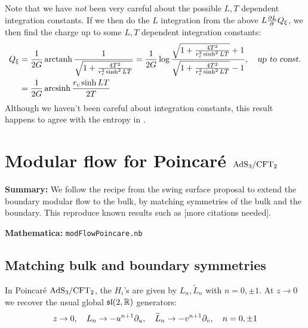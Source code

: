 \documentclass[11pt,a4paper,utf8]{article}
\renewcommand{\tilde}[1]{\ensuremath{\widetilde{#1}}}
\begin{document}
	Note that we have \textit{not} been very careful about the possible $L,T$ dependent integration constants. If we then do the $L$ integration from the above $L \frac{\partial{L}}{\partial{\,}}Q_\xi$, we then find the charge up to some $L,T$ dependent integration constants:
	\begin{equation}
	\begin{aligned}
		Q_\xi
		&= \frac{1}{2G} \operatorname{arctanh}
			\frac{1}{\sqrt{
				1 + \frac{4T^2}{r_c^2 \sinh^2 LT}
			}}
		= \frac{1}{2G} \log
			\frac{
				\sqrt{
					1 + \frac{4T^2}{r_c^2 \sinh^2 LT}
				} + 1
			}{
				\sqrt{
					1 + \frac{4T^2}{r_c^2 \sinh^2 LT}
				} - 1
			},
	\quad\textsl{up to const.} \\
		&= \frac{1}{2G} \operatorname{arcsinh}
			\frac{r_c \sinh LT}{2T}
	\end{aligned}
	\end{equation}
	Although we haven't been careful about integration constants, this result happens to agree with the entropy in \cite{Lewkowycz:2019xse}. 
	
	
\pagebreak
\appendix
\section{Modular flow for Poincar\'e $\mathrm{AdS}_3/\mathrm{CFT}_2$}
\label{sect:modFlowPoincare}

\textbf{Summary:} We follow the recipe from the swing surface proposal \cite{Apolo:2020bld,Apolo:2020qjm} to extend the boundary modular flow to the bulk, by matching symmetries of the bulk and the boundary. This reproduce known results such as \cite{Lashkari:2016idm,Czech:2019vih,Apolo:2020qjm} [more citations needed].

\noindent\textbf{Mathematica:} \texttt{modFlowPoincare.nb}

\subsection{Matching bulk and boundary symmetries}
	In Poincar\'e $\mathrm{AdS}_3/\mathrm{CFT}_2$, the $H_i$'s are given by $L_n,\tilde{L}_n$ with $n=0,\pm 1$. At $z\to 0$ we recover the usual global $\mathfrak{sl}(2,\mathbb{R})$ generators:
	\begin{equation}
		z\to 0,
	\quad
		      L_n \to -u^{n+1} \pdd{u},\quad
		\tilde{L}_n \to -v^{n+1} \pdd{v},\quad
	n = 0,\pm 1
	\end{equation}
	
\end{document}
